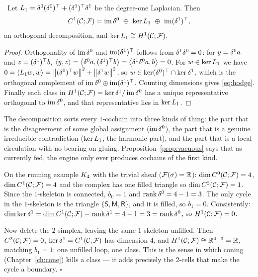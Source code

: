 \begin{theorem}\label{thm:hodge}
\Proved\ Let $L_{1}=\delta^0(\delta^0)^\top+(\delta^1)^\top\delta^1$ be the
degree-one Laplacian. Then
\begin{equation}\label{eq:hodge}
  \Cone=\im\cob^0\ \oplus\ \ker\Lapk{1}\ \oplus\ \im(\cob^1)^\top,
\end{equation}
an orthogonal decomposition, and $\ker L_{1}\cong H^{1}(\mathcal{C};\mathcal{F})$.
\end{theorem}
\begin{proof}
Orthogonality of $\operatorname{im}\delta^0$ and $\operatorname{im}(\delta^1)^\top$ follows from
$\delta^1\delta^0=0$: for $y=\delta^0a$ and $z=(\delta^1)^\top b$,
$\left\langle y,z\right\rangle=\left\langle \delta^0a,(\delta^1)^\top b\right\rangle
=\left\langle \delta^1\delta^0a,b\right\rangle=0$.
For $w\in\ker L_{1}$ we have
$0=\left\langle L_{1}w,w\right\rangle=\left\lVert (\delta^0)^\top w \right\rVert^2+\left\lVert \delta^1w \right\rVert^2$, so
$w\in\ker(\delta^0)^\top\cap\ker\delta^1$, which is the orthogonal
complement of $\operatorname{im}\delta^0\oplus\operatorname{im}(\delta^1)^\top$. Counting dimensions
gives \eqref{eq:hodge}. Finally each class in
$H^{1}(\mathcal{C};\mathcal{F})=\ker\delta^1/\operatorname{im}\delta^0$ has a unique representative orthogonal to
$\operatorname{im}\delta^0$, and that representative lies in $\ker L_{1}$.
\end{proof}

\begin{intu}\Intu
The decomposition sorts every $1$-cochain into three kinds of thing:
the part that is the disagreement of some global assignment
($\operatorname{im}\delta^0$), the part that is a genuine irreducible contradiction
($\ker L_{1}$, the harmonic part), and the part that is a local
circulation with no bearing on gluing. Proposition~\ref{prop:vacuous}
says that as currently fed, the engine only ever produces cochains of
the first kind.
\end{intu}

\begin{workedbox}\Worked
On the running example $K_4$ with the trivial sheaf
($\mathcal{F}(\sigma)=\mathbb{R}$): $\dim C^{0}(\mathcal{C};\mathcal{F})=4$, $\dim C^{1}(\mathcal{C};\mathcal{F})=4$ and the complex has
one filled triangle so $\dim C^{2}(\mathcal{C};\mathcal{F})=1$. Since the $1$-skeleton is
connected, $b_0=1$ and $\operatorname{rank}\delta^0=4-1=3$. The only cycle in the
$1$-skeleton is the triangle $\{\mathsf S,\mathsf M,\mathsf R\}$, and it
is filled, so $b_1=0$. Consistently:
$\dim\ker\delta^1=\dim C^{1}(\mathcal{C};\mathcal{F})-\operatorname{rank}\delta^1=4-1=3=\operatorname{rank}\delta^0$, so
$H^{1}(\mathcal{C};\mathcal{F})=0$.

Now delete the $2$-simplex, leaving the same $1$-skeleton unfilled. Then
$C^{2}(\mathcal{C};\mathcal{F})=0$, $\ker\delta^1=C^{1}(\mathcal{C};\mathcal{F})$ has dimension $4$, and
$H^{1}(\mathcal{C};\mathcal{F})\cong\mathbb{R}^{4-3}=\mathbb{R}$, matching $b_1=1$: one unfilled loop, one
class. This is the sense in which coning (Chapter~\ref{ch:cone}) kills
a class --- it adds precisely the $2$-cells that make the cycle a
boundary.
\hfill$\square$
\end{workedbox}

